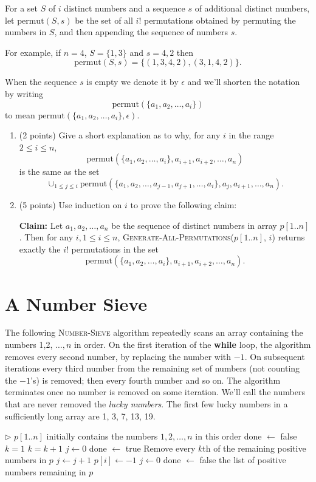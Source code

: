 \documentclass[11pt]{article}
\newcommand{\permset}{\mbox{permut}}
\begin{document}
For a set $S$ of $i$ distinct numbers and a sequence $s$ of additional distinct numbers, let $\permset(S,s)$ be the set of all $i!$ permutations obtained by permuting the numbers in $S$, and then appending the sequence of numbers $s$.

For example, if $n= 4$, $S = \{1,3\}$ and $s = 4,2$ then
\[
\permset(S,s) = \{ (1,3,4,2), (3,1,4,2) \}.
\]

When the sequence $s$ is empty we denote it by $\epsilon$ and we'll shorten the notation by writing
\[\permset(\{a_1,a_2,\ldots,a_i\})
\]
to mean
$\permset(\{a_1,a_2,\ldots,a_i\}, \epsilon)$.

\begin{enumerate}
\item (2 points)
Give a short explanation as to why, for any $i$ in the range $2 \le i \le n$, 
\[
\permset(\{a_1,a_2,\ldots,a_i\}, a_{i+1}, a_{i+2},\ldots,a_n)
\]
is the same as the set
\[
\cup_{1 \le j \le i} \permset(\{a_1,a_2,\ldots,a_{j-1},a_{j+1},\ldots,a_i\}, a_j, a_{i+1},\ldots,a_n).
\]

\item (5 points)
Use induction on $i$ to prove the following claim:

\noindent
{\bf Claim:}
Let $a_1, a_2, \ldots, a_n$ be the sequence of distinct numbers in array $p[1..n]$. Then for any $i, 1\le i \le n$, \textsc{Generate-All-Permutations}($p[1..n]$, $i$) returns exactly the $i!$ permutations in the set
\[
\permset(\{a_1,a_2,\ldots,a_i\}, a_{i+1}, a_{i+2},\ldots,a_n).
\]
\end{enumerate}

\newpage

\section{A Number Sieve}
The following \textsc{Number-Sieve} algorithm repeatedly scans an
array containing the numbers 1,2, $\ldots, n$ in order.  On the first
iteration of the {\bf while} loop, the algorithm removes every second
number, by replacing the number with $-1$.  On subsequent iterations
every third number from the remaining set of numbers (not counting the
$-1$'s) is removed; then every fourth number and so on.  The algorithm
terminates once no number is removed on some iteration. We'll call
the numbers that are never removed the {\em lucky numbers}.  The first
few lucky numbers in a sufficiently long array are 1, 3, 7, 13, 19.

\begin{algorithmic}[1]
\State $\triangleright$ $p[1..n]$ initially contains the numbers $1,2,\ldots,n$ in this order
\State done $\gets$ false
\State $k = 1$
\State $k = k+1$
\State $j \gets 0$
\State done $\gets$ true
 \Comment Remove every $k$th of the remaining positive numbers in $p$ 
      \State $j \gets j+1$
         \State $p[i] \gets -1$
         \State $j \gets 0$
         \State done $\gets$ false
      \EndIf
   \EndIf     
   \EndFor
\EndWhile   
\State \Return the list of positive numbers remaining in $p$
\EndFunction
\end{algorithmic}
\end{document}
